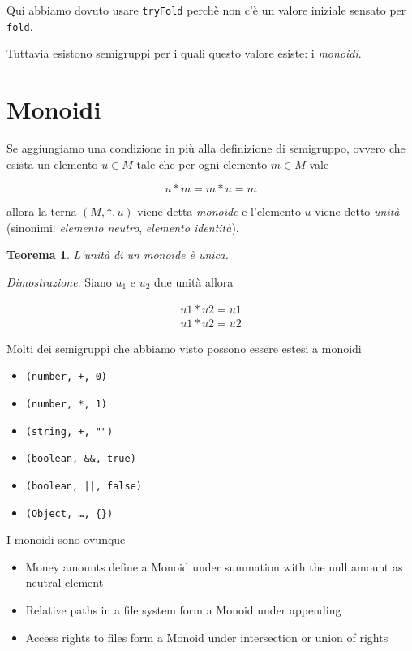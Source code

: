 \documentclass[12pt]{article}
\newtheorem{theorem}{Teorema}[section]
\begin{document}
Qui abbiamo dovuto usare \texttt{tryFold} perchè non c'è un valore iniziale sensato per \texttt{fold}.

Tuttavia esistono semigruppi per i quali questo valore esiste: i \emph{monoidi}.

\section{Monoidi}

Se aggiungiamo una condizione in più alla definizione di semigruppo, ovvero che esista un elemento $u \in M$
tale che per ogni elemento $m \in M$ vale

$$
u * m = m * u = m
$$

allora la terna $(M, *, u)$ viene detta \emph{monoide} e l'elemento $u$ viene detto \emph{unità}
(sinonimi: \emph{elemento neutro}, \emph{elemento identità}).

\begin{theorem}
L'unità di un monoide è unica.
\end{theorem}

\emph{Dimostrazione}. Siano $u_1$ e $u_2$ due unità allora

\begin{eqnarray}
u1 * u2 = u1 \\
u1 * u2 = u2
\end{eqnarray}

Molti dei semigruppi che abbiamo visto possono essere estesi a monoidi

\begin{itemize}
  \item \texttt{(number, +, 0)}
  \item \texttt{(number, *, 1)}
  \item \texttt{(string, +, "")}
  \item \texttt{(boolean, \&\&, true)}
  \item \texttt{(boolean, ||, false)}
  \item \texttt{(Object, \ldots, \{\})}
\end{itemize}

I monoidi sono ovunque

\begin{itemize}
  \item Money amounts define a Monoid under summation with the null amount as neutral element
  \item Relative paths in a file system form a Monoid under appending
  \item Access rights to files form a Monoid under intersection or union of rights
\end{itemize}
\end{document}
